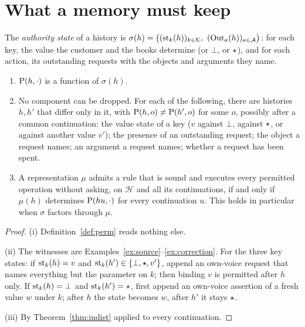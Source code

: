 \section{What a memory must keep}\label{sec:statistic}

\begin{definition}
The \emph{authority state} of a history is
$\sigma(h) = \big( (\st_k(h))_{k \in \Keys},\ (\Out_a(h))_{a \in \Act} \big)$: for each key, the
value the customer and the books determine (or $\bot$, or $\star$), and for each action, its
outstanding requests with the objects and arguments they name.
\end{definition}

\begin{theorem}\label{thm:statistic}
\begin{enumerate}
\item[(i)] $\mathrm{P}(h, \cdot)$ is a function of $\sigma(h)$.
\item[(ii)] No component can be dropped. For each of the following, there are histories $h, h'$
  that differ only in it, with $\mathrm{P}(h, o) \neq \mathrm{P}(h', o)$ for some $o$, possibly after a
  common continuation: the value state of a key ($v$ against $\bot$, against $\star$, or
  against another value $v'$); the presence of an outstanding request; the object a request
  names; an argument a request names; whether a request has been spent.
\item[(iii)] A representation $\mu$ admits a rule that is sound and executes every permitted
  operation without asking, on $\mathcal{H}$ and all its continuations, if and only if $\mu(h)$
  determines $\mathrm{P}(hu, \cdot)$ for every continuation $u$. This holds in particular when
  $\sigma$ factors through $\mu$.
\end{enumerate}
\end{theorem}
\begin{proof}
(i) Definition~\ref{def:perm} reads nothing else.

(ii) The witnesses are Examples~\ref{ex:source}--\ref{ex:correction}. For the three key states:
if $\mathrm{st}_k(h) = v$ and $\mathrm{st}_k(h') \in \{\bot, \star, v'\}$, append an own-voice request that
names everything but the parameter on $k$; then binding $v$ is permitted after $h$ only. If
$\mathrm{st}_k(h) = \bot$ and $\mathrm{st}_k(h') = \star$, first append an own-voice assertion of a fresh value
$w$ under $k$; after $h$ the state becomes $w$, after $h'$ it stays $\star$.

(iii) By Theorem~\ref{thm:indist} applied to every continuation.
\end{proof}

